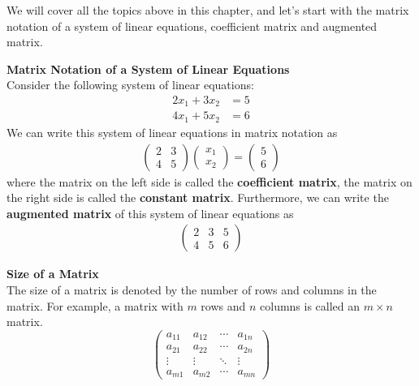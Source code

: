 \documentclass[10pt, a4paper]{article}
\begin{document}
We will cover all the topics above in this chapter, and let's start with the matrix notation of a system of linear equations, coefficient matrix and augmented matrix. 
\begin{example}
    \textbf{Matrix Notation of a System of Linear Equations}\\
    Consider the following system of linear equations:
    \begin{align*}
        2x_1+3x_2&=5 \\
        4x_1+5x_2&=6
    \end{align*}
    We can write this system of linear equations in matrix notation as
    \begin{align*}
        \begin{pmatrix}
            2 & 3 \\
            4 & 5
        \end{pmatrix} \begin{pmatrix}
            x_1 \\ x_2
        \end{pmatrix} = \begin{pmatrix}
            5 \\ 6
        \end{pmatrix}
    \end{align*}
    where the matrix on the left side is called the \textbf{coefficient matrix}, the matrix on the right side is called the \textbf{constant matrix}.
    Furthermore, we can write the \textbf{augmented matrix} of this system of linear equations as
    \begin{align*}
        \begin{pmatrix}
            2 & 3 & 5 \\
            4 & 5 & 6
        \end{pmatrix}
    \end{align*}
\end{example}
\begin{definition}
    \textbf{Size of a Matrix}\\
    The size of a matrix is denoted by the number of rows and columns in the matrix. For example, a matrix with $m$ rows and $n$ columns is called an $m\times n$ matrix.
    \[\begin{pmatrix}
        a_{11} & a_{12} & \cdots & a_{1n} \\
        a_{21} & a_{22} & \cdots & a_{2n} \\
        \vdots & \vdots & \ddots & \vdots \\
        a_{m1} & a_{m2} & \cdots & a_{mn}
    \end{pmatrix}\]
\end{definition}
\end{document}
